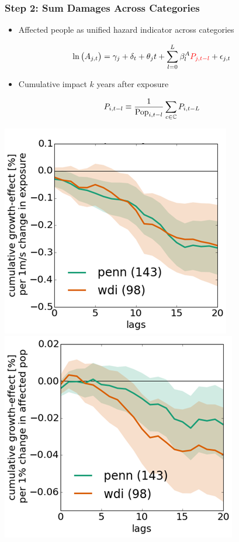 \documentclass[
c,
11pt,
aspectratio=169, %
final,
]{beamer}
\begin{document}
\begin{frame}
  \frametitle{Step 2: Sum Damages Across Categories}
  \begin{minipage}[t]{.6\linewidth}
    \vspace{0pt}
  \begin{itemize}
  \item Affected people  as unified hazard indicator across categories
  \end{itemize}
  \begin{equation*}
    \ln\big(A_{j,t}\big) = \gamma_j + \delta_{t} + \theta_j t + \sum_{l=0}^{L}\bA_{l}\tc{red}{P_{j,t-l}}+\epsilon_{j,t}
  \end{equation*}
  \begin{itemize}
  \item Cumulative impact $k$ years after exposure
  \end{itemize}
  \begin{equation*}
    P_{i,t-l}\equiv\frac{1}{\operatorname{Pop}_{i,t-l}}\sum_{c\in\mbC} P_{i,t-L}
  \end{equation*}
\end{minipage}\hfill
\begin{minipage}[t]{.39\linewidth}  
  \vspace{-30pt}
  \raggedleft
  \centering
  \includegraphics[width=.6\textwidth]{figures/ind_windspeed}
  \vfill
  \raggedleft
  \centering
  \includegraphics[width=.6\textwidth]{figures/ind_affected_people}
\end{minipage}
\end{frame}
\end{document}
